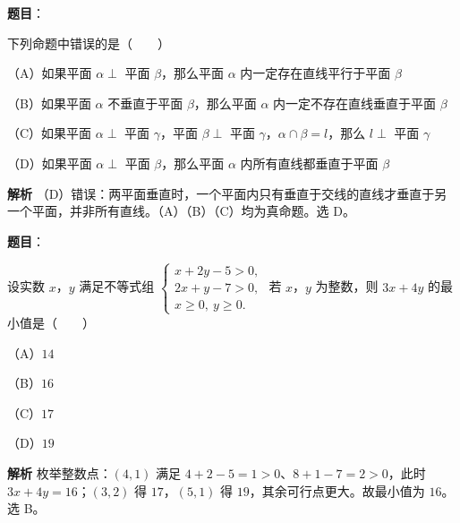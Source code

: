 \begin{answer}

\textbf{题目}：

下列命题中错误的是\mbox{（　　）}

（A）如果平面 $\alpha\perp$ 平面 $\beta$，那么平面 $\alpha$ 内一定存在直线平行于平面 $\beta$

（B）如果平面 $\alpha$ 不垂直于平面 $\beta$，那么平面 $\alpha$ 内一定不存在直线垂直于平面 $\beta$

（C）如果平面 $\alpha\perp$ 平面 $\gamma$，平面 $\beta\perp$ 平面 $\gamma$，$\alpha\cap\beta=l$，那么 $l\perp$ 平面 $\gamma$

（D）如果平面 $\alpha\perp$ 平面 $\beta$，那么平面 $\alpha$ 内所有直线都垂直于平面 $\beta$

\textbf{解析}
（D）错误：两平面垂直时，一个平面内只有垂直于交线的直线才垂直于另一个平面，并非所有直线。（A）（B）（C）均为真命题。选 D。


\end{answer}
\begin{answer}

\textbf{题目}：

设实数 $x$，$y$ 满足不等式组 $\begin{cases}x+2y-5>0,\\2x+y-7>0,\\x\geqslant0,\ y\geqslant0.\end{cases}$ 若 $x$，$y$ 为整数，则 $3x+4y$ 的最小值是\mbox{（　　）}

（A）$14$

（B）$16$

（C）$17$

（D）$19$

\textbf{解析}
枚举整数点：$(4,1)$ 满足 $4+2-5=1>0$、$8+1-7=2>0$，此时 $3x+4y=16$；$(3,2)$ 得 $17$，$(5,1)$ 得 $19$，其余可行点更大。故最小值为 $16$。选 B。


\end{answer}
